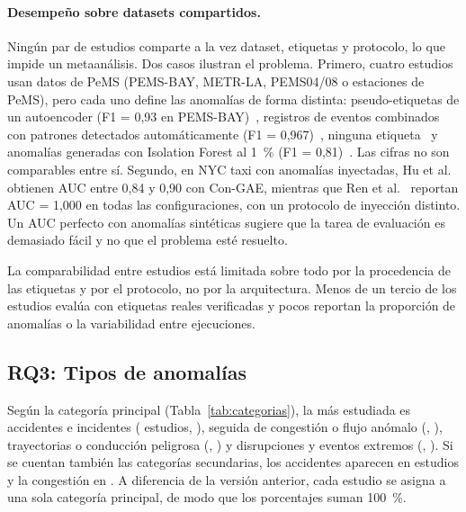 \documentclass[12pt, a4paper]{article}
\begin{document}
\paragraph{Desempe\~{n}o sobre datasets compartidos.} Ning\'{u}n par de estudios comparte a la vez dataset, etiquetas y protocolo, lo que impide un metaan\'{a}lisis. Dos casos ilustran el problema. Primero, cuatro estudios usan datos de PeMS (PEMS-BAY, METR-LA, PEMS04/08 o estaciones de PeMS), pero cada uno define las anomal\'{i}as de forma distinta: pseudo-etiquetas de un autoencoder (F1 = 0,93 en PEMS-BAY)~\cite{abdallah2025aipurban}, registros de eventos combinados con patrones detectados autom\'{a}ticamente (F1 = 0,967)~\cite{duan2025multimodal}, ninguna etiqueta~\cite{jia2025prediction} y anomal\'{i}as generadas con Isolation Forest al 1~\% (F1 = 0,81)~\cite{jadhav2026multistage}. Las cifras no son comparables entre s\'{i}. Segundo, en NYC taxi con anomal\'{i}as inyectadas, Hu et al.~\cite{hu2022detecting} obtienen AUC entre 0,84 y 0,90 con Con-GAE, mientras que Ren et al.~\cite{ren2024graph} reportan AUC = 1,000 en todas las configuraciones, con un protocolo de inyecci\'{o}n distinto. Un AUC perfecto con anomal\'{i}as sint\'{e}ticas sugiere que la tarea de evaluaci\'{o}n es demasiado f\'{a}cil y no que el problema est\'{e} resuelto.

\begin{hallazgo}
La comparabilidad entre estudios est\'{a} limitada sobre todo por la procedencia de las etiquetas y por el protocolo, no por la arquitectura. Menos de un tercio de los estudios eval\'{u}a con etiquetas reales verificadas y pocos reportan la proporci\'{o}n de anomal\'{i}as o la variabilidad entre ejecuciones.
\end{hallazgo}

\subsection{RQ3: Tipos de anomal\'{i}as}

Seg\'{u}n la categor\'{i}a principal (Tabla~\ref{tab:categorias}), la m\'{a}s estudiada es accidentes e incidentes (\NcatA{} estudios, \PcatA), seguida de congesti\'{o}n o flujo an\'{o}malo (\NcatB, \PcatB), trayectorias o conducci\'{o}n peligrosa (\NcatC, \PcatC) y disrupciones y eventos extremos (\NcatD, \PcatD). Si se cuentan tambi\'{e}n las categor\'{i}as secundarias, los accidentes aparecen en \NcatAnyA{} estudios y la congesti\'{o}n en \NcatAnyB. A diferencia de la versi\'{o}n anterior, cada estudio se asigna a una sola categor\'{i}a principal, de modo que los porcentajes suman 100~\%.
\end{document}
